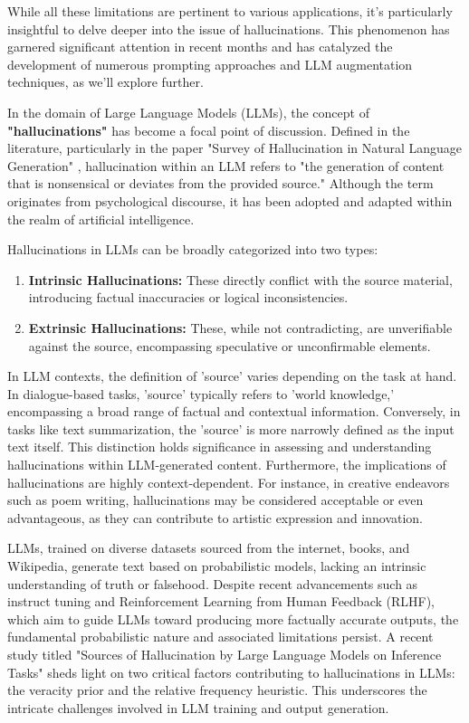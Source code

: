 While all these limitations are pertinent to various applications, it's particularly insightful to delve deeper into the issue of hallucinations. This phenomenon has garnered significant attention in recent months and has catalyzed the development of numerous prompting approaches and LLM augmentation techniques, as we'll explore further.

\hfill

In the domain of Large Language Models (LLMs), the concept of \textbf{"hallucinations"} has become a focal point of discussion. Defined in the literature, particularly in the paper "Survey of Hallucination in Natural Language Generation" \cite{Ji_2023}, hallucination within an LLM refers to "the generation of content that is nonsensical or deviates from the provided source." Although the term originates from psychological discourse, it has been adopted and adapted within the realm of artificial intelligence.

Hallucinations in LLMs can be broadly categorized into
two types:

\begin{enumerate}
    \item \textbf{Intrinsic Hallucinations:} These directly conflict with the source material, introducing factual inaccuracies or logical inconsistencies.
    \item \textbf{Extrinsic Hallucinations:} These, while not contradicting, are unverifiable against the source, encompassing speculative or unconfirmable elements.
\end{enumerate}

In LLM contexts, the definition of 'source' varies depending on the task at hand. In dialogue-based tasks, 'source' typically refers to 'world knowledge,' encompassing a broad range of factual and contextual information. Conversely, in tasks like text summarization, the 'source' is more narrowly defined as the input text itself. This distinction holds significance in assessing and understanding hallucinations within LLM-generated content. Furthermore, the implications of hallucinations are highly context-dependent. For instance, in creative endeavors such as poem writing, hallucinations may be considered acceptable or even advantageous, as they can contribute to artistic expression and innovation.

LLMs, trained on diverse datasets sourced from the internet, books, and Wikipedia, generate text based on probabilistic models, lacking an intrinsic understanding of truth or falsehood. Despite recent advancements such as instruct tuning and Reinforcement Learning from Human Feedback (RLHF), which aim to guide LLMs toward producing more factually accurate outputs, the fundamental probabilistic nature and associated limitations persist. A recent study titled "Sources of Hallucination by Large Language Models on Inference Tasks" \cite{mckenna2023sources} sheds light on two critical factors contributing to hallucinations in LLMs: the veracity prior and the relative frequency heuristic. This underscores the intricate challenges involved in LLM training and output generation.


